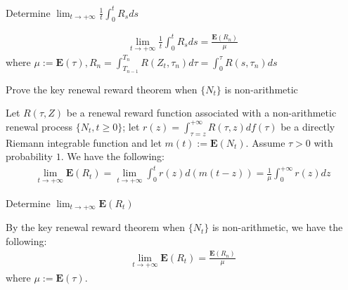 \documentclass[11pt]{article}
\newcommand{\expect}[1]{\mathbf{E}(#1)}
\newcommand*{\xfield}[1]{\begin{mdframed}\centering #1\end{mdframed}\bigskip}
\newenvironment{field}{}{}
\newenvironment{note}{}{}
\begin{document}
%
\begin{note}
  \xfield{Determine \(\displaystyle \lim_{t \to +\infty} \frac{1}{t} \int_0^t R_s
    ds\)}
  \begin{field}
    \begin{align*}
      \lim_{t \to +\infty} \frac{1}{t} \int_0^t R_s ds = \frac{\expect{R_n}}{\mu}
    \end{align*}
    where \(\mu := \expect{\tau}, R_n = \displaystyle \int_{T_{n-1}}^{T_n} R(Z_t,
    \tau_n) d \tau =  \int_0^\tau R(s, \tau_n) ds\)
  \end{field}
\end{note}
%
\begin{note}
  \xfield{Prove the key renewal reward theorem when \(\{N_t\}\) is non-arithmetic}
  \begin{field}
    Let \(R(\tau, Z)\) be a renewal reward function associated with a
    non-arithmetic renewal process \(\{N_t, t \geq 0\}\); let \(r(z) =
    \int_{\tau = z}^{+\infty} R(\tau, z) d f(\tau)\) be a directly
    Riemann integrable function and let \(m(t) :=
    \expect{N_t}\). Assume \(\tau > 0\) with probability \(1\). We
    have the following:
    \begin{align*}
      \displaystyle
      \lim_{t \to +\infty} \expect{R_t} = \lim_{t \to +\infty}
      \int_0^t r(z) d( m(t-z) ) = \frac{1}{\mu} \int_0^{+\infty} r(z) dz
    \end{align*}
  \end{field}

\end{note}
%
\begin{note}
  \xfield{Determine \(\displaystyle \lim_{t \to +\infty}
    \expect{R_t}\)}
  \begin{field}
    By the key renewal reward theorem when \(\{N_t\}\) is
    non-arithmetic, we have the following:
    \begin{align*}
      \displaystyle
      \lim_{t \to +\infty} \expect{R_t} = \frac{\expect{R_n}}{\mu}
    \end{align*}
    where \(\mu := \expect{\tau}\).
  \end{field}

\end{note}
\end{document}
